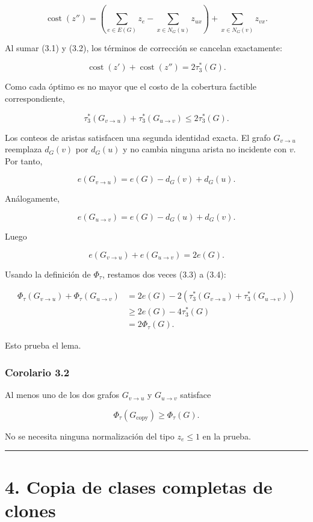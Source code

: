 \documentclass[
  11pt,
]{article}
\begin{document}
\[
\operatorname{cost}(z'')
=
\left(
\sum_{e\in E(G)}z_e
-
\sum_{x\in N_G(u)}z_{ux}
\right)
+
\sum_{x\in N_G(v)}z_{vx}.
\tag{3.2}
\]

Al sumar (3.1) y (3.2), los términos de corrección se cancelan
exactamente:

\[
\operatorname{cost}(z')
+
\operatorname{cost}(z'')
=
2\tau_3^*(G).
\]

Como cada óptimo es no mayor que el costo de la cobertura factible
correspondiente,

\[
\tau_3^*(G_{v\to u})
+
\tau_3^*(G_{u\to v})
\le
2\tau_3^*(G).
\tag{3.3}
\]

Los conteos de aristas satisfacen una segunda identidad exacta. El grafo
\(G_{v\to u}\) reemplaza \(d_G(v)\) por \(d_G(u)\) y no cambia ninguna
arista no incidente con \(v\). Por tanto,

\[
e(G_{v\to u})
=
e(G)-d_G(v)+d_G(u).
\]

Análogamente,

\[
e(G_{u\to v})
=
e(G)-d_G(u)+d_G(v).
\]

Luego

\[
e(G_{v\to u})+e(G_{u\to v})=2e(G).
\tag{3.4}
\]

Usando la definición de \(\Phi_\tau\), restamos dos veces (3.3) a (3.4):

\[
\begin{aligned}
\Phi_\tau(G_{v\to u})
+
\Phi_\tau(G_{u\to v})
&=
2e(G)
-
2\left(
\tau_3^*(G_{v\to u})
+
\tau_3^*(G_{u\to v})
\right)\\
&\ge
2e(G)-4\tau_3^*(G)\\
&=
2\Phi_\tau(G).
\end{aligned}
\]

Esto prueba el lema.

\subsubsection{Corolario 3.2}\label{corolario-3.2}

Al menos uno de los dos grafos \(G_{v\to u}\) y \(G_{u\to v}\) satisface

\[
\Phi_\tau(G_{\mathrm{copy}})\ge\Phi_\tau(G).
\]

No se necesita ninguna normalización del tipo \(z_e\le1\) en la prueba.

\begin{center}\rule{0.5\linewidth}{0.5pt}\end{center}

\section{4. Copia de clases completas de
clones}\label{copia-de-clases-completas-de-clones}
\end{document}
